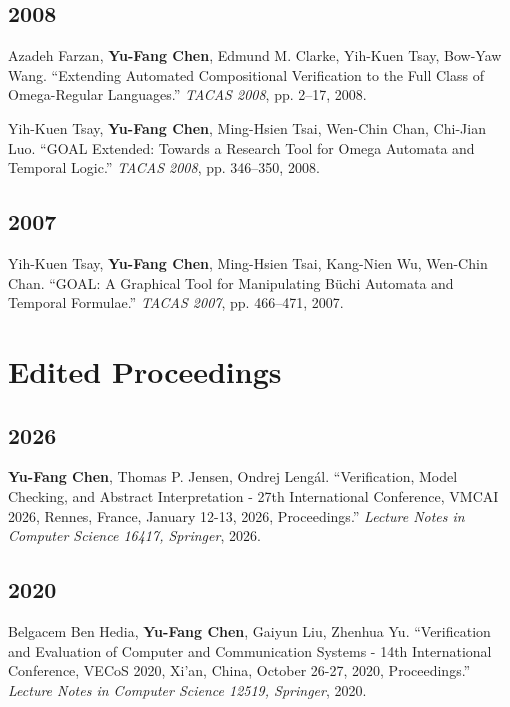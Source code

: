 \documentclass[10.5pt]{article}
\begin{document}
\subsection*{2008}
\begin{enumerate}[leftmargin=*,label={[\arabic*]},resume]
\item Azadeh Farzan, \textbf{Yu-Fang Chen}, Edmund M. Clarke, Yih-Kuen Tsay, Bow-Yaw Wang. ``Extending Automated Compositional Verification to the Full Class of Omega-Regular Languages.'' \emph{TACAS 2008}, pp. 2--17, 2008.
\item Yih-Kuen Tsay, \textbf{Yu-Fang Chen}, Ming-Hsien Tsai, Wen-Chin Chan, Chi-Jian Luo. ``GOAL Extended: Towards a Research Tool for Omega Automata and Temporal Logic.'' \emph{TACAS 2008}, pp. 346--350, 2008.
\end{enumerate}
\subsection*{2007}
\begin{enumerate}[leftmargin=*,label={[\arabic*]},resume]
\item Yih-Kuen Tsay, \textbf{Yu-Fang Chen}, Ming-Hsien Tsai, Kang-Nien Wu, Wen-Chin Chan. ``GOAL: A Graphical Tool for Manipulating Büchi Automata and Temporal Formulae.'' \emph{TACAS 2007}, pp. 466--471, 2007.
\end{enumerate}
\section*{Edited Proceedings}
\subsection*{2026}
\begin{enumerate}[leftmargin=*,label={[\arabic*]},resume]
\item \textbf{Yu-Fang Chen}, Thomas P. Jensen, Ondrej Lengál. ``Verification, Model Checking, and Abstract Interpretation - 27th International Conference, VMCAI 2026, Rennes, France, January 12-13, 2026, Proceedings.'' \emph{Lecture Notes in Computer Science 16417, Springer}, 2026.
\end{enumerate}
\subsection*{2020}
\begin{enumerate}[leftmargin=*,label={[\arabic*]},resume]
\item Belgacem Ben Hedia, \textbf{Yu-Fang Chen}, Gaiyun Liu, Zhenhua Yu. ``Verification and Evaluation of Computer and Communication Systems - 14th International Conference, VECoS 2020, Xi'an, China, October 26-27, 2020, Proceedings.'' \emph{Lecture Notes in Computer Science 12519, Springer}, 2020.
\end{enumerate}
\end{document}
